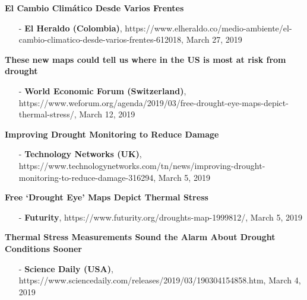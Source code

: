 \documentclass[10pt]{article}
\newenvironment{changemargin}[2]{%
  \begin{list}{}{%
 \setlength{\topsep}{0pt}%
 \setlength{\leftmargin}{#1}%
 \setlength{\rightmargin}{#2}%
 \setlength{\listparindent}{\parindent}%
 \setlength{\itemindent}{\parindent}%
 \setlength{\parsep}{\parskip}%
  }%
  \item[]}{\end{list}
}
\newenvironment{body} {
  \vspace*{-2pt}
  \begin{changemargin}{-0.5in}{-0.5in}
}
{\end{changemargin}
}
\begin{document}
\begin{body}
  \textbf {El Cambio Climático Desde Varios Frentes}\\
  \vspace*{-4pt}
  \begin{itemize} \itemsep -0pt
    \item[-]\textbf{El Heraldo (Colombia)}, https://www.elheraldo.co/medio-ambiente/el-cambio-climatico-desde-varios-frentes-612018, \hfill{March 27, 2019}\\
  \end{itemize} 

  \textbf {These new maps could tell us where in the US is most at risk from drought}\\
  \vspace*{-4pt}
  \begin{itemize} \itemsep -0pt
    \item[-]\textbf{World Economic Forum (Switzerland)}, https://www.weforum.org/agenda/2019/03/free-drought-eye-maps-depict-thermal-stress/, \hfill{March 12, 2019}\\
  \end{itemize} 

  \textbf {Improving Drought Monitoring to Reduce Damage}\\
  \vspace*{-4pt}
  \begin{itemize} \itemsep -0pt
    \item[-]\textbf{Technology Networks (UK)}, https://www.technologynetworks.com/tn/news/improving-drought-monitoring-to-reduce-damage-316294, \hfill{March 5, 2019}\\
  \end{itemize} 

  \textbf {Free ‘Drought Eye’ Maps Depict Thermal Stress}\\
  \vspace*{-4pt}
  \begin{itemize} \itemsep -0pt
    \item[-]\textbf{Futurity}, https://www.futurity.org/droughts-map-1999812/, \hfill{March 5, 2019}\\
  \end{itemize} 

  \textbf {Thermal Stress Measurements Sound the Alarm About Drought Conditions Sooner}\\
  \vspace*{-4pt}
  \begin{itemize} \itemsep -0pt
    \item[-]  \textbf{Science Daily (USA)}, https://www.sciencedaily.com/releases/2019/03/190304154858.htm, \hfill{March 4, 2019}\\
  \end{itemize} 


\end{body}
\end{document}
